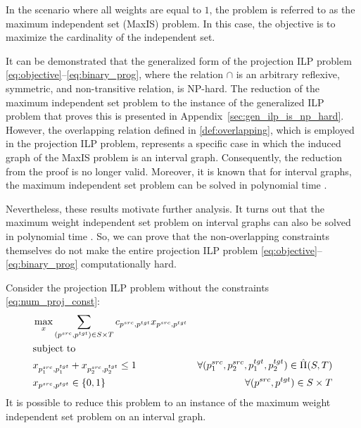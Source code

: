 In the scenario where all weights are equal to \( 1 \), the problem is referred to as
the maximum independent set (MaxIS) problem. In this case, the objective is to maximize
the cardinality of the independent set.

It can be demonstrated that the generalized form of the projection ILP problem
\eqref{eq:objective}--\eqref{eq:binary_prog}, where the relation \( \cap \) is an
arbitrary reflexive, symmetric, and non-transitive relation, is NP-hard. The
reduction of the maximum independent set problem to the instance of the generalized
ILP problem that proves this is presented in Appendix~\ref{sec:gen_ilp_is_np_hard}.
However, the overlapping relation defined in \ref{def:overlapping}, which is
employed in the projection ILP problem, represents a specific case in which
the induced graph of the MaxIS problem is an interval graph. Consequently, the
reduction from the proof is no longer valid. Moreover, it is known that for interval graphs,
the maximum independent set problem can be solved in polynomial time \cite{bhattacharya2014maximum}.

Nevertheless, these results motivate further analysis. It turns out that the maximum
weight independent set problem on interval graphs can also be solved in polynomial
time \cite{PalB96}. So, we can prove that the non-overlapping constraints themselves
do not make the entire projection ILP problem \eqref{eq:objective}--\eqref{eq:binary_prog}
computationally hard.

Consider the projection ILP problem without the constraints \eqref{eq:num_proj_const}:
\begin{equation} \label{eq:ilp_without_nproj}
  \begin{aligned}
    & \max\limits_x \sum\limits_{(p^{src}, p^{tgt}) \in S \times T} c_{p^{src}, p^{tgt}} x_{p^{src}, p^{tgt}}                                             \\
    & \text{subject to}                                                                                                                                   \\
    & x_{p_1^{src}, p_1^{tgt}} + x_{p_2^{src}, p_2^{tgt}} \leq 1
    & \forall (p_1^{src}, p_2^{src}, p_1^{tgt}, p_2^{tgt}) \in \hat{\Pi}(S, T)                                                                            \\
    & x_{p^{src}, p^{tgt}} \in \{ 0, 1 \}                                                                     & \forall (p^{src}, p^{tgt}) \in S \times T
  \end{aligned}
\end{equation}
It is possible to reduce this problem to an instance of the maximum weight
independent set problem on an interval graph.

